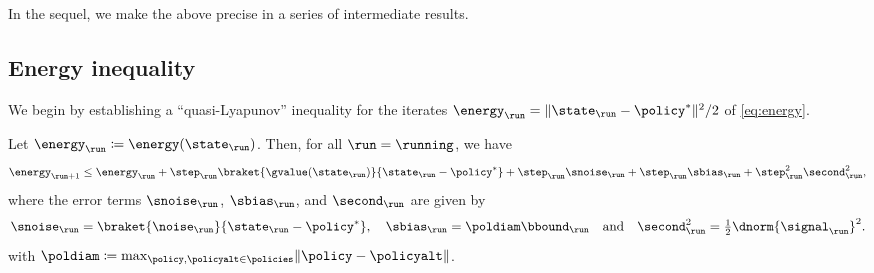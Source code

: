 In the sequel, we make the above precise in a series of intermediate results.


\subsection{Energy inequality}

We begin by establishing a ``quasi-Lyapunov'' inequality for the iterates $\curr[\energy] = \norm{\curr - \eq}^{2}/2$ of \eqref{eq:energy}.

\begin{lemma}
\label{lem:energy}
Let $\curr[\energy] \defeq \energy(\curr)$.
Then, for all $\run = \running$, we have
\begin{equation}
\label{eq:template}
\next[\energy]
	\leq \curr[\energy]
		+ \curr[\step] \braket{\gvalue(\curr)}{\curr - \eq}
		+ \curr[\step] \curr[\snoise]
		+ \curr[\step] \curr[\sbias]
		+ \curr[\step]^{2} \curr[\second]^{2},
\end{equation}
where the error terms $\curr[\snoise]$, $\curr[\sbias]$, and $\curr[\second]$ are given by
\begin{equation}
\label{eq:errors}
\curr[\snoise]
	= \braket{\curr[\noise]}{\curr - \eq},
	\quad
\curr[\sbias]
	= \poldiam \curr[\bbound]
	\quad
	\text{and}
	\quad
\curr[\second]^{2}
	= \tfrac{1}{2} \dnorm{\curr[\signal]}^{2}.
\end{equation}
with $\poldiam \defeq \max_{\policy,\policyalt\in\policies} \norm{\policy - \policyalt}$.
\end{lemma}

